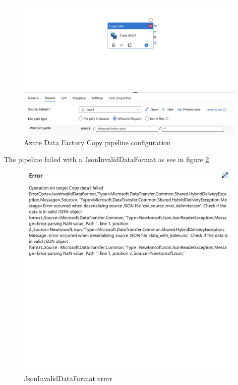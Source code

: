 \documentclass[11pt, oneside]{article}   	%
\begin{document}
\begin{figure}[H] %
   \centering
   \includegraphics[width=6in]{images/pipeline_config.png} 
   \caption{Azure Data Factory Copy pipeline configuration}
   \label{fig:pipeline_config}
\end{figure}



 The pipeline  failed with a JsonInvalidDataFormat as see in figure \ref{fig:error}
 \begin{figure}[H] %
   \centering
   \includegraphics[width=6in]{images/error.png} 
   \caption{JsonInvalidDataFormat error}
   \label{fig:error}
\end{figure}
\end{document}
